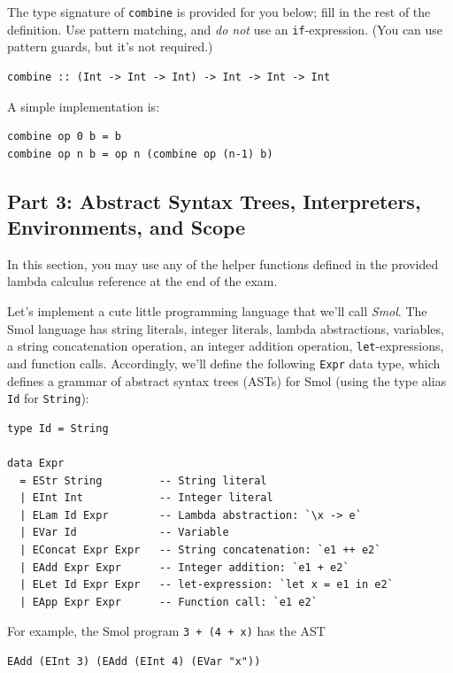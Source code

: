 \documentclass[addpoints]{exam}
\begin{document}
\begin{questions}
The type signature of \verb|combine| is provided for you below; fill in the rest of the definition.  Use pattern matching, and \emph{do not} use an \verb|if|-expression.  (You can use pattern guards, but it's not required.)

\begin{verbatim}
combine :: (Int -> Int -> Int) -> Int -> Int -> Int
\end{verbatim}
\begin{solutionorbox}[\stretch{1}]
A simple implementation is:
\begin{verbatim}
combine op 0 b = b
combine op n b = op n (combine op (n-1) b)
\end{verbatim}
\end{solutionorbox}

\newpage

\subsection*{\textbf{Part 3: Abstract Syntax Trees, Interpreters, Environments, and Scope}}

In this section, you may use any of the helper functions defined in the provided lambda calculus reference at the end of the exam.

Let's implement a cute little programming language that we'll call \emph{Smol}.  The Smol language has string literals, integer literals, lambda abstractions, variables, a string concatenation operation, an integer addition operation, \verb|let|-expressions, and function calls.  Accordingly, we'll define the following \verb|Expr| data type, which defines a grammar of abstract syntax trees (ASTs) for Smol (using the type alias \verb|Id| for \verb|String|):

\begin{verbatim}
type Id = String

data Expr 
  = EStr String         -- String literal
  | EInt Int            -- Integer literal  
  | ELam Id Expr        -- Lambda abstraction: `\x -> e`
  | EVar Id             -- Variable
  | EConcat Expr Expr   -- String concatenation: `e1 ++ e2`
  | EAdd Expr Expr      -- Integer addition: `e1 + e2`
  | ELet Id Expr Expr   -- let-expression: `let x = e1 in e2`
  | EApp Expr Expr      -- Function call: `e1 e2`
\end{verbatim}

For example, the Smol program \verb|3 + (4 + x)| has the AST

\begin{verbatim}
EAdd (EInt 3) (EAdd (EInt 4) (EVar "x"))
\end{verbatim}


\end{questions}
\end{document}
